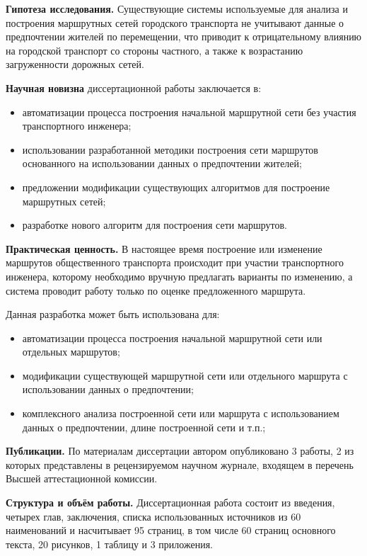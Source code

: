 \textbf{Гипотеза исследования.} Существующие системы используемые для анализа и построения маршрутных сетей 
городского транспорта не учитывают данные о предпочтении жителей по перемещении, что приводит к отрицательному 
влиянию на городской транспорт со стороны частного, а также к возрастанию загруженности дорожных сетей.

\textbf{Научная новизна} диссертационной работы заключается в:
\begin{itemize}
    \item автоматизации процесса построения начальной маршрутной сети без участия транспортного инженера;
    \item использовании разработанной методики построения сети маршрутов основанного на использовании данных о 
        предпочтении жителей;
    \item предложении модификации существующих алгоритмов для построение маршрутных сетей;
    \item разработке нового алгоритм для построения сети маршрутов.
\end{itemize}

\textbf{Практическая ценность.}
В настоящее время построение или изменение маршрутов общественного транспорта происходит при участии 
транспортного инженера, которому необходимо вручную предлагать варианты по изменению, а система проводит 
работу только по оценке предложенного маршрута. 

Данная разработка может быть использована для:
\begin{itemize}
    \item автоматизации процесса построения начальной маршрутной сети или отдельных маршрутов;
    \item модификации существующей маршрутной сети или отдельного маршрута с использовании данных о 
        предпочтении;
    \item комплексного анализа построенной сети или маршрута с использованием данных о предпочтении, длине 
        построенной сети и т.п.;
\end{itemize}

\textbf{Публикации.} По материалам диссертации автором опубликовано 3 работы, 2 из которых представлены 
в рецензируемом научном журнале, входящем в перечень Высшей аттестационной комиссии. 

\textbf{Структура и объём работы.} Диссертационная работа состоит из введения, четырех глав, заключения, 
списка использованных источников из 60 наименований и насчитывает 95 страниц, в том числе 60 страниц 
основного текста, 20 рисунков, 1 таблицу и 3 приложения.

